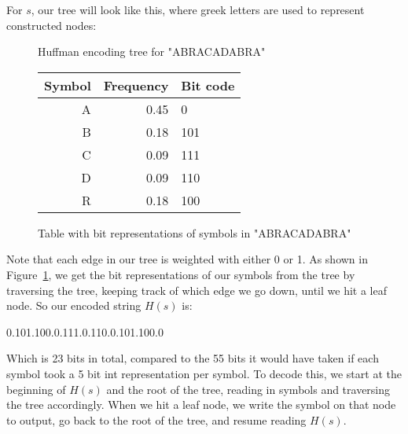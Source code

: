 \documentclass[11pt]{article}
\newcommand\genref{}
\newcommand\figref{}
\def\genref#1#2{#1~\ref{#2}}
\def\figref#1{\genref{Figure}{#1}}
\begin{document}
For $s$, our tree will look like this, where greek letters are used to represent constructed nodes:
\begin{figure}[H]\begin{center}\caption{Huffman encoding tree for "ABRACADABRA"}\end{center}\end{figure}
\begin{figure}[H]\label{huffman-table-fig}\begin{center}\begin{tabular}{ r | r | l }
	Symbol & Frequency & Bit code\\
	\hline
	A & 0.45 & 0\\
	B & 0.18 & 101\\
	C & 0.09 & 111\\
	D & 0.09 & 110\\
	R & 0.18 & 100\\
\end{tabular}\caption{Table with bit representations of symbols in "ABRACADABRA"}\end{center}\end{figure}
Note that each edge in our tree is weighted with either 0 or 1.
As shown in \figref{huffman-table-fig}, we get the bit representations of our symbols from the tree by traversing the 
tree, keeping track of which edge we go down, until we hit a leaf node. So our encoded string $H(s)$ is:
\begin{center}0.101.100.0.111.0.110.0.101.100.0\end{center}
Which is 23 bits in total, compared to the 55 bits it would have taken if each symbol took a 5 bit int representation 
per symbol. To decode this, we start at the beginning of $H(s)$ and the root of the tree, reading in symbols 
and traversing the tree accordingly. When we hit a leaf node, we write the symbol on that node to output, 
go back to the root of the tree, and resume reading $H(s)$.
\end{document}
